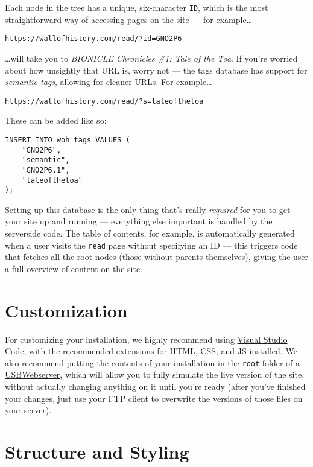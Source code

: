 \documentclass[11pt]{article} %
\begin{document}
Each node in the tree has a unique, six-character \texttt{ID}, which is the most straightforward way of accessing pages on the site — for example…
\begin{center}
\texttt{https://wallofhistory.com/read/?id=GNO2P6}
\end{center}
…will take you to \textit{BIONICLE Chronicles \#1: Tale of the Toa}. If you’re worried about how unsightly that URL is, worry not — the tags database has support for \textit{semantic tags}, allowing for cleaner URLs. For example…
\begin{center}
\texttt{https://wallofhistory.com/read/?s=taleofthetoa}
\end{center}

These can be added like so:

\begin{verbatim}
INSERT INTO woh_tags VALUES (
    "GNO2P6",
    "semantic",
    "GNO2P6.1",
    "taleofthetoa"
);
\end{verbatim}

Setting up this database is the only thing that’s really \textit{required} for you to get your site up and running — everything else important is handled by the serverside code. The table of contents, for example, is automatically generated when a user visits the \texttt{read} page without specifying an ID — this triggers code that fetches all the root nodes (those without parents themselves), giving the user a full overview of content on the site.

\section{Customization}

For customizing your installation, we highly recommend using \href{https://code.visualstudio.com/}{Visual Studio Code}, with the recommended extensions for HTML, CSS, and JS installed. We also recommend putting the contents of your installation in the \texttt{root} folder of a \href{https://www.usbwebserver.net/webserver/}{USBWebserver}, which will allow you to fully simulate the live version of the site, without actually changing anything on it until you’re ready (after you’ve finished your changes, just use your FTP client to overwrite the versions of those files on your server).

\section{Structure and Styling}
\end{document}
